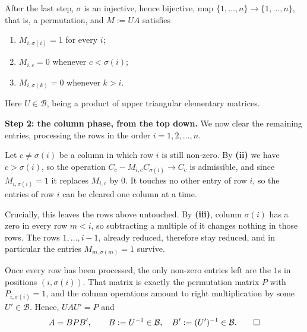 \begin{exercisesolution}
After the last step, $\sigma$ is an injective, hence bijective, map $\{1, \dots, n\} \to \{1, \dots, n\}$, that is, a permutation, and $M := UA$ satisfies
\begin{enumerate}[label=\textbf{(\roman*)}]
    \item $M_{i, \sigma(i)} = 1$ for every $i$;
    \item $M_{i, c} = 0$ whenever $c < \sigma(i)$;
    \item $M_{i, \sigma(k)} = 0$ whenever $k > i$.
\end{enumerate}
Here $U \in \mathcal{B}$, being a product of upper triangular elementary matrices.

\textbf{Step 2: the column phase, from the top down.} We now clear the remaining entries, processing the rows in the order $i = 1, 2, \dots, n$.

Let $c \ne \sigma(i)$ be a column in which row $i$ is still non-zero. By \textbf{(ii)} we have $c > \sigma(i)$, so the operation $C_c - M_{i,c} C_{\sigma(i)} \to C_c$ is admissible, and since $M_{i, \sigma(i)} = 1$ it replaces $M_{i,c}$ by $0$. It touches no other entry of row $i$, so the entries of row $i$ can be cleared one column at a time.

Crucially, this leaves the rows above untouched. By \textbf{(iii)}, column $\sigma(i)$ has a zero in every row $m < i$, so subtracting a multiple of it changes nothing in those rows. The rows $1, \dots, i-1$, already reduced, therefore stay reduced, and in particular the entries $M_{m, \sigma(m)} = 1$ survive.

Once every row has been processed, the only non-zero entries left are the $1$s in positions $(i, \sigma(i))$. That matrix is exactly the permutation matrix $P$ with $P_{i, \sigma(i)} = 1$, and the column operations amount to right multiplication by some $U' \in \mathcal{B}$. Hence, $U A U' = P$ and
\[
A = B P B', \qquad B := U^{-1} \in \mathcal{B}, \quad B' := (U')^{-1} \in \mathcal{B}. \qedhere
\]
\end{exercisesolution}

